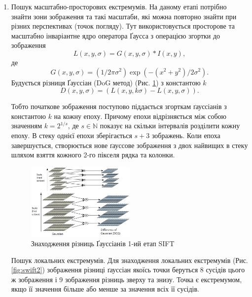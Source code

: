 \begin{enumerate}
    \item Пошук масштабно-просторових екстремумів.
          На даному етапі потрібно знайти зони зображення та такі масштаби, які можна повторно
          знайти при різних перспективах (точок погляду). Тут використовується просторове та
          масштабно інваріантне ядро оператора Ґаусса з операцією згортки 
          до зображення 
          \begin{equation*}
              L(x,y,\sigma) = G(x,y,\sigma) \ast I(x,y),
          \end{equation*}
          де 
          \begin{equation*}
              G(x,y,\sigma) = (1/2\pi\sigma^2)\exp({-(x^2+y^2)/2\sigma^2}).
          \end{equation*}
          Будується різниця Ґауссіан (DoG метод) (Рис. \ref{fig:swift1}) з константою $k$
          \begin{equation*}
              D(x,y,\sigma) = (L(x,y,k\sigma) - L(x,y,\sigma)).
          \end{equation*}

          Тобто початкове зображення поступово піддається згорткам ґауссіанів з константою
          $k$ на кожну епоху. Причому епохи відрізняється між собою значенням $k = 2^{1/s}$,
          де $s\in\mathbb{N}$ показує на скільки інтервалів розділити кожну епоху.
          В стеку однієї епохи зберігається $s+3$ зображень. Коли епоха завершується,
          створюється нове ґауссове зображення з двох найвищих в стеку
          шляхом взяття кожного 2-го пікселя рядка та колонки.

          \begin{figure}[H]
              \centering
              \includegraphics[width=0.5\textwidth]{images/sift1}
              \caption{Знаходження різниць Ґауссіанів 1-ий етап SIFT \cite{sift}
                  \label{fig:swift1}
              }
          \end{figure}

          \subitem Пошук локальних екстремумів. Для знаходження локальних екстремумів 
          (Рис. \ref{fig:swift2}) зображення
          різниці ґауссіан якоїсь точки беруться 8 сусідів цього ж зображення і 9 зображення
          різниць зверху та знизу. Точка є екстремумом, якщо її значення більше або менше за
          значення всіх її сусідів.


\end{enumerate}
